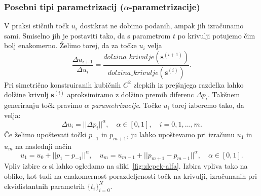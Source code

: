 \documentclass[isrm2, tisk]{fmfdelo}
\begin{document}
    \subsubsection{Posebni tipi parametrizacij ($\alpha$-parametrizacije)}
    V praksi stičnih točk $u_i$ dostikrat ne dobimo podanih, ampak jih izračunamo sami.
    Smiselno jih je postaviti tako, da s parametrom $t$ po krivulji potujemo čim bolj enakomerno.
    Želimo torej, da za točke $u_i$ velja \[\frac{\Delta u_{i+1}}{\Delta u_i} = \frac{dolzina\_krivulje(\mathbf{s}^{(i+1)})}{dolzina\_krivulje(\mathbf{s}^{(i)})}.\]
    Pri simetrično konstruiranih kubičnih $C^2$ zlepkih iz prejšnjega razdelka lahko dolžine krivulj $\mathbf{s}^{(i)}$ aproksimiramo z dolžino premih diferenc $\Delta p_i$.
    Takšnem generiranju točk pravimo \textit{$\alpha$ parametrizacije}.
    Točke $u_i$ torej izberemo tako, da velja:
    \[\Delta u_i=||\Delta p_i||^{\alpha},\quad \alpha\in[0,1],\quad i=0,1,\ldots,m.\]
    Če želimo upoštevati točki $p_{-1}$ in $p_{m+1}$, ju lahko upoštevamo pri izračunu $u_1$ in $u_m$ na naslednji način
    \[ u_1=u_0+|| p_1-p_{-1}||^{\alpha}, \quad  u_m=u_{m-1}+|| p_{m+1}-p_{m-1}||^{\alpha}, \quad  \alpha\in[0,1].\]
    Vpliv izbire $\alpha$ si lahko ogledamo na sliki~\ref{fig:zlepek-alfa}.
    Izbira vpliva tako na obliko, kot tudi na enakomernost porazdeljenosti točk na krivulji, izračunanih pri ekvidistantnih parametrih $\{t_i\}_{i=0}^{N}$.
\end{document}
